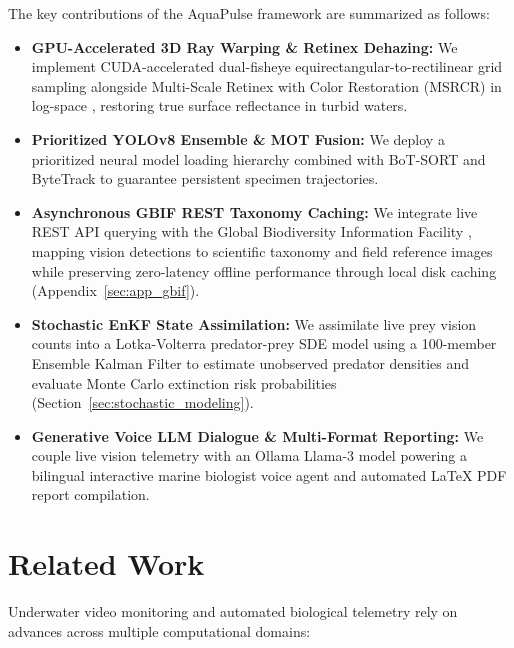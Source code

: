 \documentclass[11pt,a4paper]{article}
\newcommand{\citeblue}[1]{{\color{linkblue}\cite{#1}}}
\newcommand{\refblue}[1]{{\color{linkblue}\ref{#1}}}
\begin{document}
The key contributions of the AquaPulse framework are summarized as follows:
\begin{itemize}
    \item \textbf{GPU-Accelerated 3D Ray Warping \& Retinex Dehazing:} We implement CUDA-accelerated dual-fisheye equirectangular-to-rectilinear grid sampling alongside Multi-Scale Retinex with Color Restoration (MSRCR) in log-space \citeblue{land1971lightness, jobson1997multiscale, ancuti2012enhancing}, restoring true surface reflectance in turbid waters.
    \item \textbf{Prioritized YOLOv8 Ensemble \& MOT Fusion:} We deploy a prioritized neural model loading hierarchy \citeblue{jocher2023ultralytics} combined with BoT-SORT \citeblue{aharon2022botsort} and ByteTrack \citeblue{zhang2022bytetrack} to guarantee persistent specimen trajectories.
    \item \textbf{Asynchronous GBIF REST Taxonomy Caching:} We integrate live REST API querying with the Global Biodiversity Information Facility \citeblue{gbif2026backbone}, mapping vision detections to scientific taxonomy and field reference images while preserving zero-latency offline performance through local disk caching (Appendix~\refblue{sec:app_gbif}).
    \item \textbf{Stochastic EnKF State Assimilation:} We assimilate live prey vision counts into a Lotka-Volterra predator-prey SDE model using a 100-member Ensemble Kalman Filter \citeblue{sprungk2023, evensen2009data} to estimate unobserved predator densities and evaluate Monte Carlo extinction risk probabilities (Section~\refblue{sec:stochastic_modeling}).
    \item \textbf{Generative Voice LLM Dialogue \& Multi-Format Reporting:} We couple live vision telemetry with an Ollama Llama-3 model \citeblue{touvron2023llama, dubey2024llama3} powering a bilingual interactive marine biologist voice agent and automated LaTeX PDF report compilation.
\end{itemize}

\section{Related Work}
Underwater video monitoring and automated biological telemetry rely on advances across multiple computational domains:
\end{document}
